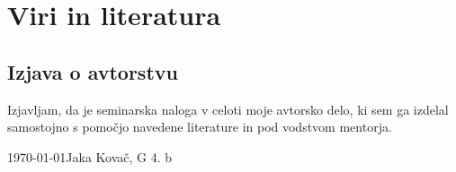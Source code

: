 \documentclass[12pt]{article}
\begin{document}
\newpage
\begingroup
\makeatletter
    \section{Viri in literatura}
    \nocite{*}
    \printbibliography[heading=none]
\makeatother
\endgroup
\newpage

\begin{samepage}
    \thispagestyle{empty}
    \section*{Izjava o avtorstvu}
    Izjavljam, da je seminarska naloga v celoti moje avtorsko delo, ki sem ga 
    izdelal samostojno s pomočjo navedene literature in pod vodstvom mentorja.

    \vfill
    
    \today \hfill Jaka Kovač, G 4. b
    
    \vspace{3 cm}
\end{samepage}
\end{document}
